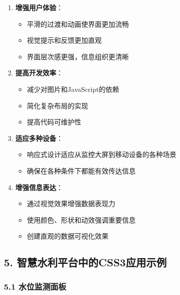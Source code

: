 \begin{enumerate}
\def\labelenumi{\arabic{enumi}.}
\tightlist
\item
  \textbf{增强用户体验}：

  \begin{itemize}
  \tightlist
  \item
    平滑的过渡和动画使界面更加流畅
  \item
    视觉提示和反馈更加直观
  \item
    界面层次感更强，信息组织更清晰
  \end{itemize}
\item
  \textbf{提高开发效率}：

  \begin{itemize}
  \tightlist
  \item
    减少对图片和JavaScript的依赖
  \item
    简化复杂布局的实现
  \item
    提高代码可维护性
  \end{itemize}
\item
  \textbf{适应多种设备}：

  \begin{itemize}
  \tightlist
  \item
    响应式设计适应从监控大屏到移动设备的各种场景
  \item
    确保在各种条件下都能有效传达信息
  \end{itemize}
\item
  \textbf{增强信息表达}：

  \begin{itemize}
  \tightlist
  \item
    通过视觉效果增强数据表现力
  \item
    使用颜色、形状和动效强调重要信息
  \item
    创建直观的数据可视化效果
  \end{itemize}
\end{enumerate}

\subsection{5.
智慧水利平台中的CSS3应用示例}\label{ux667aux6167ux6c34ux5229ux5e73ux53f0ux4e2dux7684css3ux5e94ux7528ux793aux4f8b}

\subsubsection{5.1
水位监测面板}\label{ux6c34ux4f4dux76d1ux6d4bux9762ux677f}

